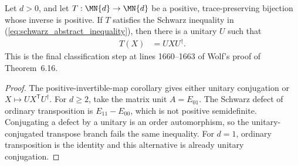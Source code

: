 \begin{theorem}
    \label{thm:wolf_cycle_schwarz_excludes_transpose}
    \leanok
    Let $d>0$, and let $T:\MN{d}\to\MN{d}$ be a positive,
    trace-preserving bijection whose inverse is positive. If $T$ satisfies the
    Schwarz inequality in (\ref{eq:schwarz_abstract_inequality}), then there is
    a unitary $U$ such that
    \begin{align}
        T(X)&=UXU^\dagger.
    \end{align}
    This is the final classification step at lines 1660--1663 of Wolf's proof
    of Theorem~6.16.
\end{theorem}

\begin{proof}
    \leanok
    The positive-invertible-map corollary gives either unitary conjugation or
    $X\mapsto UX^{\mathsf T}U^\dagger$. For $d\geq 2$, take the matrix unit
    $A=E_{01}$. The Schwarz defect of ordinary transposition is
    $E_{11}-E_{00}$, which is not positive semidefinite. Conjugating a defect
    by a unitary is an order automorphism, so the unitary-conjugated transpose
    branch fails the same inequality. For $d=1$, ordinary transposition is the
    identity and this alternative is already unitary conjugation.
\end{proof}

